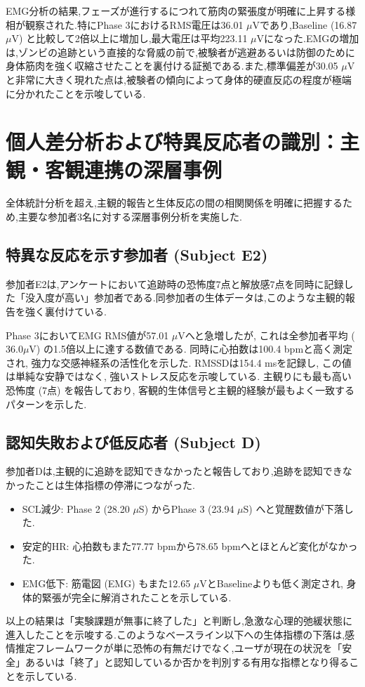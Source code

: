 \documentclass[book,paper=a4,fontsize=10pt,jafontscale=0.92]{jlreq}
\begin{document}
EMG分析の結果,フェーズが進行するにつれて筋肉の緊張度が明確に上昇する様相が観察された.特にPhase 3におけるRMS電圧は36.01 $\mu$Vであり,Baseline (16.87 $\mu$V) と比較して2倍以上に増加し,最大電圧は平均223.11 $\mu$Vになった.EMGの増加は,ゾンビの追跡という直接的な脅威の前で,被験者が逃避あるいは防御のために身体筋肉を強く収縮させたことを裏付ける証拠である.また,標準偏差が30.05 $\mu$Vと非常に大きく現れた点は,被験者の傾向によって身体的硬直反応の程度が極端に分かれたことを示唆している.

\section{個人差分析および特異反応者の識別：主観・客観連携の深層事例}
全体統計分析を超え,主観的報告と生体反応の間の相関関係を明確に把握するため,主要な参加者3名に対する深層事例分析を実施した.

\subsection{特異な反応を示す参加者 (Subject E2)}
参加者E2は,アンケートにおいて追跡時の恐怖度7点と解放感7点を同時に記録した「没入度が高い」参加者である.同参加者の生体データは,このような主観的報告を強く裏付けている.

Phase 3においてEMG RMS値が57.01 $\mu$Vへと急増したが, これは全参加者平均 ($36.0 \mu$V) の1.5倍以上に達する数値である. 同時に心拍数は100.4 bpmと高く測定され, 強力な交感神経系の活性化を示した. RMSSDは154.4 msを記録し, この値は単純な安静ではなく, 強いストレス反応を示唆している. 
主観りにも最も高い恐怖度 (7点) を報告しており, 客観的生体信号と主観的経験が最もよく一致するパターンを示した.

\subsection{認知失敗および低反応者 (Subject D)}
参加者Dは,主観的に追跡を認知できなかったと報告しており,追跡を認知できなかったことは生体指標の停滞につながった.
\begin{itemize}
\item {SCL減少}: Phase 2 (28.20 $\mu$S) からPhase 3 (23.94 $\mu$S) へと覚醒数値が下落した.
\item {安定的HR}: 心拍数もまた77.77 bpmから78.65 bpmへとほとんど変化がなかった.
\item {EMG低下}: 筋電図 (EMG) もまた12.65 $\mu$VとBaselineよりも低く測定され, 身体的緊張が完全に解消されたことを示している.
\end{itemize}
以上の結果は「実験課題が無事に終了した」と判断し,急激な心理的弛緩状態に進入したことを示唆する.このようなベースライン以下への生体指標の下落は,感情推定フレームワークが単に恐怖の有無だけでなく,ユーザが現在の状況を「安全」あるいは「終了」と認知しているか否かを判別する有用な指標となり得ることを示している.
\end{document}
